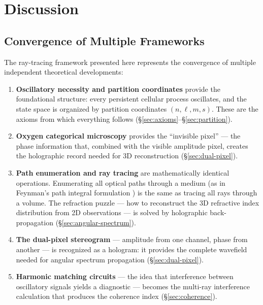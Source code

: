 \documentclass[11pt,twocolumn,a4paper]{article}
\begin{document}
\section{Discussion}
\label{sec:discussion}

\subsection{Convergence of Multiple Frameworks}

The ray-tracing framework presented here represents the convergence
of multiple independent theoretical developments:

\begin{enumerate}[leftmargin=*,itemsep=2pt]
\item \textbf{Oscillatory necessity and partition coordinates}
  provide the foundational structure: every persistent cellular process
  oscillates, and the state space is organized by partition coordinates
  $(n,\ell,m,s)$. These are the axioms from which everything follows
  (\S\ref{sec:axioms}--\S\ref{sec:partition}).

\item \textbf{Oxygen categorical microscopy} provides the ``invisible
  pixel'' --- the phase information that, combined with the visible
  amplitude pixel, creates the holographic record needed for 3D
  reconstruction (\S\ref{sec:dual-pixel}).

\item \textbf{Path enumeration and ray tracing} are mathematically
  identical operations. Enumerating all optical paths through a medium
  (as in Feynman's path integral formulation \citep{sakurai2017}) is
  the same as tracing all rays through a volume. The refraction puzzle
  --- how to reconstruct the 3D refractive index distribution from 2D
  observations --- is solved by holographic back-propagation
  (\S\ref{sec:angular-spectrum}).

\item \textbf{The dual-pixel stereogram} --- amplitude from one
  channel, phase from another --- is recognized as a hologram:
  it provides the complete wavefield needed for angular spectrum
  propagation (\S\ref{sec:dual-pixel}).

\item \textbf{Harmonic matching circuits} --- the idea that
  interference between oscillatory signals yields a diagnostic ---
  becomes the multi-ray interference calculation that produces the
  coherence index (\S\ref{sec:coherence}).


\end{enumerate}
\end{document}
